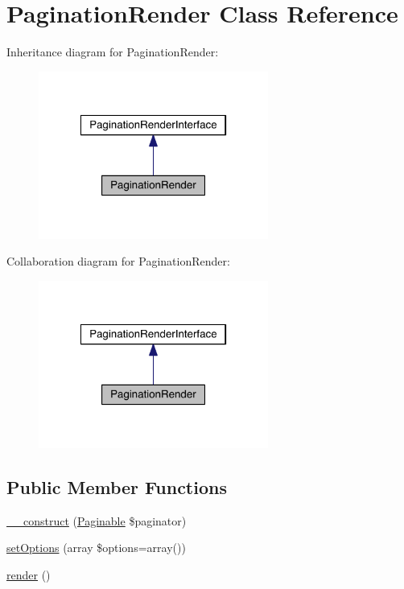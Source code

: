 \hypertarget{classapp_1_1models_1_1core_1_1_pagination_1_1_pagination_render}{\section{Pagination\-Render Class Reference}
\label{classapp_1_1models_1_1core_1_1_pagination_1_1_pagination_render}
}


Inheritance diagram for Pagination\-Render\-:
\nopagebreak
\begin{figure}[H]
\begin{center}
\leavevmode
\includegraphics[width=214pt]{classapp_1_1models_1_1core_1_1_pagination_1_1_pagination_render__inherit__graph}
\end{center}
\end{figure}


Collaboration diagram for Pagination\-Render\-:
\nopagebreak
\begin{figure}[H]
\begin{center}
\leavevmode
\includegraphics[width=214pt]{classapp_1_1models_1_1core_1_1_pagination_1_1_pagination_render__coll__graph}
\end{center}
\end{figure}
\subsection*{Public Member Functions}
\begin{DoxyCompactItemize}
\item 
\hyperlink{classapp_1_1models_1_1core_1_1_pagination_1_1_pagination_render_ab895c850c976922c85a5a5679ac51442}{\-\_\-\-\_\-construct} (\hyperlink{classapp_1_1models_1_1core_1_1_pagination_1_1_paginable}{Paginable} \$paginator)
\item 
\hyperlink{classapp_1_1models_1_1core_1_1_pagination_1_1_pagination_render_af1d97a8660b6b41198e81e0bd3708e32}{set\-Options} (array \$options=array())
\item 
\hyperlink{classapp_1_1models_1_1core_1_1_pagination_1_1_pagination_render_afde88292c44dc59faf017738dae6dffb}{render} ()
\end{DoxyCompactItemize}


